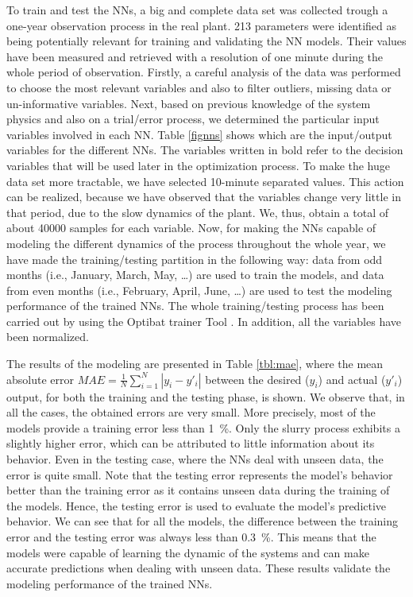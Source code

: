 To train and test the NNs, a big and complete data set was collected trough a one-year observation process in the real plant.  213 parameters were identified as being potentially relevant for training and validating the NN models. Their values have been measured and retrieved with a resolution of one minute during the whole period of observation. Firstly, a careful analysis of the data was performed to choose the most relevant variables and also to filter outliers, missing data or un-informative variables. Next, based on previous knowledge of the system physics and also on a trial/error process, we determined the particular input variables involved in each NN. Table \ref{fignns} shows which are the input/output variables for the different NNs. The variables written in bold refer to the decision variables that will be used later in the optimization process. To make the huge data set more tractable, we have selected 10-minute separated values. This action can be realized, because we have observed that the variables change very little in that period, due to the slow dynamics of the plant. We, thus, obtain a total of about \num{40000} samples for each variable. Now, for making the NNs capable of modeling the different dynamics of the process throughout the whole year, we have made the training/testing partition in the following way: data from odd months (i.e., January, March, May, \dots) are used to train the models, and data from even months (i.e., February, April, June, \dots) are used to test the modeling performance of the trained NNs. The whole training/testing process has been carried out by using the Optibat trainer Tool \cite{Optibat}. In addition, all the variables have been normalized.



The results of the modeling are presented in Table \ref{tbl:mae}, where the mean absolute error $MAE=\frac{1}{N}\sum_{i=1}^{N}{|y_i-y'_i|}$ between the desired ($y_i$) and actual ($y'_i$) output, for both the training and the testing phase, is shown. We observe that, in all the cases, the obtained  errors are very small. More precisely, most of the models provide a training error less than \SI{1}{\percent}. Only the slurry process exhibits a slightly higher error, which can be attributed to little information about its behavior. Even in the testing case, where the NNs deal with unseen data, the error is quite small. Note that the testing error represents the model's behavior better than the training error as it contains unseen data during the training of the models. Hence, the testing error is used to evaluate the  model's  predictive behavior. We can see that for all the models, the difference between the training error and the testing error was always less than \SI{0.3}{\percent}. This means that the models were capable of learning the dynamic of the systems and can make accurate predictions when dealing with unseen data. These results validate the modeling performance of the trained NNs. 

